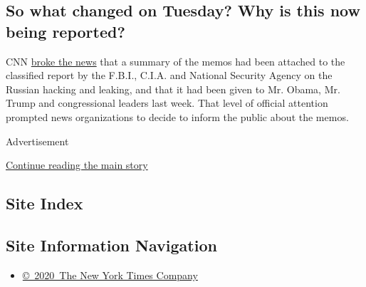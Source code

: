 \hypertarget{so-what-changed-on-tuesday-why-is-this-now-being-reported}{%
\subsection{So what changed on Tuesday? Why is this now being
reported?}\label{so-what-changed-on-tuesday-why-is-this-now-being-reported}}

CNN
\href{http://www.cnn.com/2017/01/10/politics/donald-trump-intelligence-report-russia/}{broke
the news} that a summary of the memos had been attached to the
classified report by the F.B.I., C.I.A. and National Security Agency on
the Russian hacking and leaking, and that it had been given to Mr.
Obama, Mr. Trump and congressional leaders last week. That level of
official attention prompted news organizations to decide to inform the
public about the memos.

Advertisement

\protect\hyperlink{after-bottom}{Continue reading the main story}

\hypertarget{site-index}{%
\subsection{Site Index}\label{site-index}}

\hypertarget{site-information-navigation}{%
\subsection{Site Information
Navigation}\label{site-information-navigation}}

\begin{itemize}
\tightlist
\item
  \href{https://help.nytimes.com/hc/en-us/articles/115014792127-Copyright-notice}{©~2020~The
  New York Times Company}
\end{itemize}

